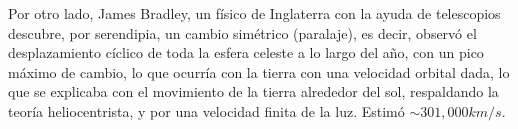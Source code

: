 \vspace{0.3cm}


Por otro lado, James Bradley, un físico de Inglaterra con la ayuda de telescopios descubre, por serendipia, un cambio simétrico (paralaje), es decir, observó el desplazamiento cíclico de toda la esfera celeste a lo largo del año, con un pico máximo de cambio, lo que ocurría con la tierra con una velocidad orbital dada, lo que se explicaba con el movimiento de la tierra alrededor del sol, respaldando la teoría heliocentrista, y por una velocidad finita de la luz. Estimó $\sim 301,000 km/s$.







\vspace{0.3cm}



